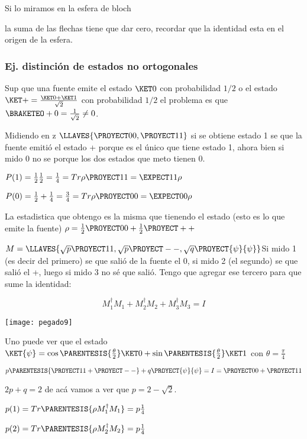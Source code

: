 Si lo miramos en la esfera de bloch 

la suma de las flechas tiene que dar cero, recordar que la identidad
esta en el origen de la esfera. 

\subsubsection{Ej. distinción de estados no ortogonales}

Sup que una fuente emite el estado $\KET 0$ con probabilidad $1/2$
o el estado $\KET +=\frac{\KET 0+\KET 1}{\sqrt{2}}$ con probabilidad
$1/2$ el problema es que $\BRAKETEO +0=\frac{1}{\sqrt{2}}\neq0$. 

Midiendo en z $\LLAVES{\PROYECT 00,\PROYECT 11}$ si se obtiene estado
1 se que la fuente emitió el estado + porque es el único que tiene
estado 1, ahora bien si mido 0 no se porque los dos estados que meto
tienen 0.

$P(1)=\frac{1}{2}\frac{1}{2}=\frac{1}{4}=Tr\rho\PROYECT 11=\EXPECT 11{\rho}$

$P(0)=\frac{1}{2}+\frac{1}{4}=\frac{3}{4}=Tr\rho\PROYECT 00=\EXPECT 00{\rho}$

La estadistica que obtengo es la misma que tienendo el estado (esto
es lo que emite la fuente) $\rho=\frac{1}{2}\PROYECT 00+\frac{1}{2}\PROYECT ++$

$M=\LLAVES{\sqrt{p}\PROYECT 11,\sqrt{p}\PROYECT --,\sqrt{q}\PROYECT{\psi}{\psi}}$Si
mido 1 (es decir del primero) se que salió de la fuente el 0, si mido
2 (el segundo) se que salió el +, luego si mido 3 no sé que salió.
Tengo que agregar ese tercero para que sume la identidad:

\[
M_{1}^{\dagger}M_{1}+M_{2}^{\dagger}M_{2}+M_{3}^{\dagger}M_{3}=I
\]

\begin{center}
\texttt{[image: pegado9]}
\par\end{center}

Uno puede ver que el estado $\KET{\psi}=\cos\PARENTESIS{\frac{\theta}{2}}\KET 0+\sin\PARENTESIS{\frac{\theta}{2}}\KET 1$
con $\theta=\frac{\pi}{4}$

$p\PARENTESIS{\PROYECT 11+\PROYECT --}+q\PROYECT{\psi}{\psi}=I=\PROYECT 00+\PROYECT 11$

$2p+q=2$ de acá vamos a ver que $p=2-\sqrt{2}$.

$p(1)=Tr\PARENTESIS{\rho M_{1}^{\dagger}M_{1}}=p\frac{1}{4}$

$p(2)=Tr\PARENTESIS{\rho M_{2}^{\dagger}M_{2}}=p\frac{1}{4}$

